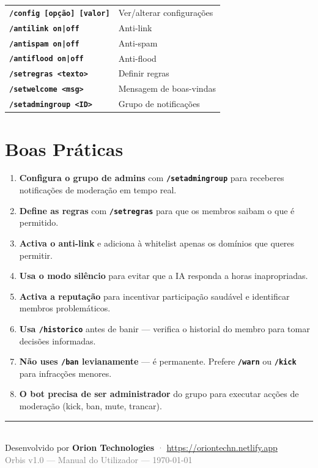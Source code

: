 \documentclass[12pt,a4paper]{article}
\newcommand{\cmd}[1]{\texttt{\textcolor{orbisblue}{\textbf{#1}}}}
\begin{document}
\begin{center}
\begin{longtable}{L{5.5cm} L{7.5cm}}
\cmd{/config [opção] [valor]} & Ver/alterar configurações \\
\cmd{/antilink on|off} & Anti-link \\
\cmd{/antispam on|off} & Anti-spam \\
\cmd{/antiflood on|off} & Anti-flood \\
\cmd{/setregras <texto>} & Definir regras \\
\cmd{/setwelcome <msg>} & Mensagem de boas-vindas \\
\cmd{/setadmingroup <ID>} & Grupo de notificações \\
\bottomrule
\end{longtable}
\end{center}

\section{Boas Práticas}
\label{sec:boas-praticas}

\begin{enumerate}[leftmargin=1.5em, itemsep=6pt]
  \item \textbf{Configura o grupo de admins} com \cmd{/setadmingroup} para receberes notificações de moderação em tempo real.
  \item \textbf{Define as regras} com \cmd{/setregras} para que os membros saibam o que é permitido.
  \item \textbf{Activa o anti-link} e adiciona à whitelist apenas os domínios que queres permitir.
  \item \textbf{Usa o modo silêncio} para evitar que a IA responda a horas inapropriadas.
  \item \textbf{Activa a reputação} para incentivar participação saudável e identificar membros problemáticos.
  \item \textbf{Usa \cmd{/historico}} antes de banir — verifica o historial do membro para tomar decisões informadas.
  \item \textbf{Não uses \cmd{/ban} levianamente} — é permanente. Prefere \cmd{/warn} ou \cmd{/kick} para infracções menores.
  \item \textbf{O bot precisa de ser administrador} do grupo para executar acções de moderação (kick, ban, mute, trancar).
\end{enumerate}

\vfill
\begin{center}
\textcolor{orbisMid}{\rule{12cm}{0.6pt}}\\[0.5cm]
{\small Desenvolvido por \textbf{Orion Technologies} \textcolor{gray}{·} \url{https://oriontechn.netlify.app}}\\[0.2cm]
{\small \textcolor{gray}{Orbis v1.0 — Manual do Utilizador — \today}}
\end{center}
\end{document}
